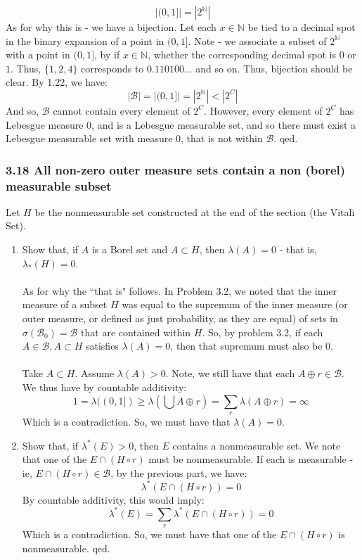 \documentclass[12pt,a4paper]{article}
\newcommand{\1}[1]{\mathbbm{1}\left\{ #1 \right\}}
\newcommand{\N}{\mathbb{N}}
\newcommand{\bcal}{\mathcal{B}}
\begin{document}
$$
	|(0,1]| = |2^\N|
$$
As for why this is - we have a bijection. Let each $x \in \N$ be tied to a decimal spot in the binary expansion of a point in $(0,1]$. Note - we associate a subset of $2^\N$ with a point in $(0,1]$, by if $x \in \N$, whether the corresponding decimal spot is $0$ or $1$. Thus, $\{1,2,4\}$ corresponds to $0.110100...$ and so on. Thus, bijection should be clear. By 1.22, we have:
$$
	|\bcal| = |(0,1]| = |2^\N| < |2^C|
$$
And so, $\bcal$ cannot contain every element of $2^C$. However, every element of $2^C$ has Lebesgue measure $0$, and is a Lebesgue measurable set, and so there must exist a Lebesgue measurable set with measure $0$, that is not within $\bcal$. qed.

\subsubsection{3.18 All non-zero outer measure sets contain a non (borel) measurable subset} Let $H$ be the nonmeasurable set constructed at the end of the section (the Vitali Set).
\begin{enumerate}
	\item Show that, if $A$ is a Borel set and $A \subset H$, then $\lambda(A) = 0$ - that is, $\lambda_*(H) = 0$.
	\\\\
	As for why the ``that is" follows. In Problem 3.2, we noted that the inner measure of a subset $H$ was equal to the supremum of the inner measure (or outer measure, or defined as just probability, as they are equal) of sets in $\sigma(\bcal_0) = \bcal$ that are contained within $H$. So, by problem 3.2, if each $A \in \bcal, A \subset H$ satisfies $\lambda(A) = 0$, then that supremum must also be $0$.
	\\\\
	Take $A \subset H$. Assume $\lambda(A) > 0$. Note, we still have that each $A \oplus r \in \bcal$. We thus have by countable additivity:
	$$
		1 = \lambda((0,1]) \geq \lambda\left(\bigcup A \oplus r\right) = \sum_r \lambda(A \oplus r) = \infty
	$$
	Which is a contradiction. So, we must have that $\lambda(A) = 0$.
	
	\item Show that, if $\lambda^*(E) > 0$, then $E$ contains a nonmeasurable set. We note that one of the $E \cap (H \circ r)$ must be nonmeasurable. If each is measurable - ie, $E \cap (H \circ r) \in \bcal$, by the previous part, we have:
	$$
		\lambda^*(E \cap (H \circ r)) = 0
	$$
	By countable additivity, this would imply:
	$$
		\lambda^*(E) = \sum_r \lambda^*(E \cap (H \circ r)) = 0
	$$
	Which is a contradiction. So, we must have that one of the $E \cap (H \circ r)$ is nonmeasurable. qed.
\end{enumerate}
\end{document}
